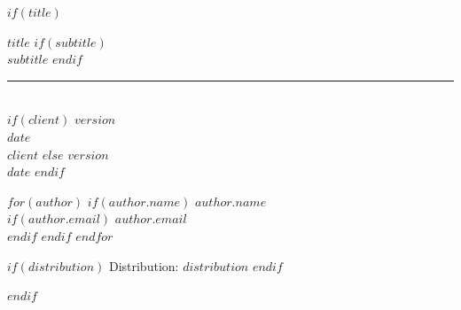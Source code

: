 \documentclass[10pt, letterpaper, titlepage, oneside, openright, final, article]{memoir}
\begin{document}
%
$if(title)$
    \ifpdf
    \fi
    \newlength{\centeroffset}
    \thispagestyle{empty}
    \vspace*{2.25in}
    \begin{flushleft}
        {
            {\fontsize{20.28pt}{22pt}$title$}
            $if(subtitle)$
                {\\\fontsize{18.28pt}{22pt}$subtitle$}
            $endif$
        }
        \noindent\rule[-1ex]{\textwidth}{1pt}\\[2.8ex]
        $if(client)$
            {\fontsize{12pt}{14pt}$version$\\$date$\\}
            {\fontsize{14pt}{22pt}$client$}
        $else$
            {\fontsize{12pt}{14pt}$version$\\$date$}
        $endif$

        \vspace*{\fill}

        $for(author)$
            $if(author.name)$
                {\fontsize{14pt}{14pt}$author.name$\\}
                $if(author.email)$
                    {\fontsize{12pt}{14pt}$author.email$\\}
                $endif$
            $endif$
            \vspace*{1em}
        $endfor$

        $if(distribution)$
            \vspace*{0.5in}
            {\fontsize{12pt}{14pt}Distribution: $distribution$}
        $endif$
    \end{flushleft}
$endif$

\frontmatter
\end{document}
